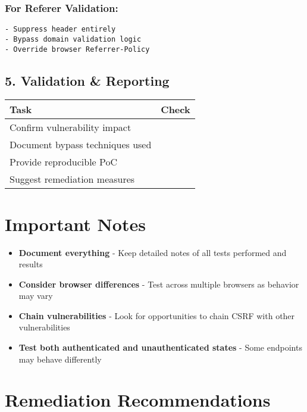 \documentclass{article}
\begin{document}
\subsubsection*{For Referer Validation:}
\begin{lstlisting}[frame=single, basicstyle=\footnotesize\ttfamily]
- Suppress header entirely
- Bypass domain validation logic
- Override browser Referrer-Policy
\end{lstlisting}

\subsection*{5. Validation \& Reporting}
\begin{tabular}{>{\raggedright\arraybackslash}p{}c}
    \toprule
    \textbf{Task} & \textbf{Check} \\
    \midrule
    Confirm vulnerability impact & \\
    Document bypass techniques used  \\
    Provide reproducible PoC  \\
    Suggest remediation measures \\
    \bottomrule
\end{tabular}

\section*{Important Notes}

\begin{itemize}
    \item \textbf{Document everything} - Keep detailed notes of all tests performed and results
    \item \textbf{Consider browser differences} - Test across multiple browsers as behavior may vary
    \item \textbf{Chain vulnerabilities} - Look for opportunities to chain CSRF with other vulnerabilities
    \item \textbf{Test both authenticated and unauthenticated states} - Some endpoints may behave differently
\end{itemize}

\section*{Remediation Recommendations}
\end{document}
